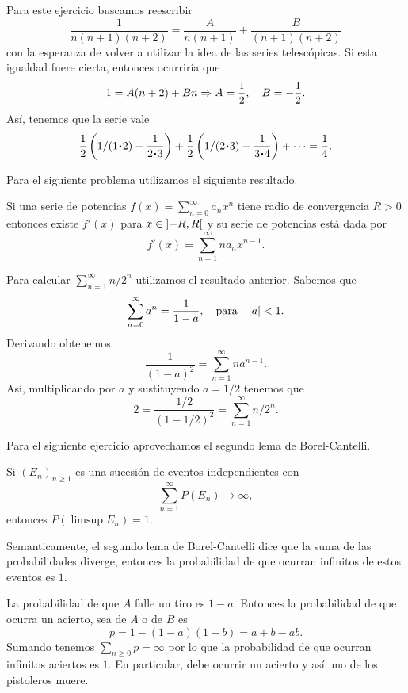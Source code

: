 \documentclass[12pt]{memoir}
\begin{document}
\begin{Ej}
    Para este ejercicio buscamos reescribir
    \[
    \frac{1}{n(n+1)(n+2)}=\frac{A}{n(n+1)}+\frac{B}{(n+1)(n+2)}
    \]
    con la esperanza de volver a utilizar la idea de las series telescópicas. Si esta igualdad fuere cierta, entonces ocurriría que 
    \[
    1=A(n+2)+Bn\To A=\half,\quad B=-\half.
    \]
    Así, tenemos que la serie vale
    \[
    \half\left(1/(1\.2)-\frac{1}{2\.3}\right)+\half\left(1/(2\.3)-\frac{1}{3\.4}\right)+\dots=\frac{1}{4}.
    \]
\end{Ej}

Para el siguiente problema utilizamos el siguiente resultado.

\begin{Th}
Si una serie de potencias \(f(x)=\sum_{n=0}^{\infty}a_nx^n\) tiene radio de convergencia \(R>0\) entonces existe \(f'(x)\) para \(x\in\left\rbrack-R,R\right\lbrack\) y su serie de potencias está dada por 
\[
f'(x)=\sum_{n=1}^{\infty}na_nx^{n-1}.
\]
\end{Th}

\begin{Ej}
    Para calcular \(\sum_{n=1}^{\infty}n/2^n\) utilizamos el resultado anterior. Sabemos que 
    \[
    \sum_{n=0}^{\infty}a^n=\frac{1}{1-a},\quad\text{para}\quad|a|<1.
    \]
    Derivando obtenemos 
    \[
    \frac{1}{(1-a)^2}=\sum_{n=1}^{\infty}na^{n-1}.
    \]
    Así, multiplicando por \(a\) y sustituyendo \(a=1/2\) tenemos que 
    \[
    2=\frac{1/2}{(1-1/2)^2}=\sum_{n=1}^{\infty}n/2^n.
    \]
\end{Ej}

Para el siguiente ejercicio aprovechamos el segundo lema de Borel-Cantelli. 

\begin{Th}
    Si \((E_n)_{n\geq 1}\) es una sucesión de eventos independientes con 
    \[
    \sum_{n=1}^\infty P(E_n)\to\infty,
    \]
    entonces \(P(\limsup E_n) = 1\). 
\end{Th}

Semanticamente, el segundo lema de Borel-Cantelli dice que la suma de las probabilidades diverge, entonces la probabilidad de que ocurran infinitos de estos eventos es \(1\).

\begin{Ej}
    La probabilidad de que \(A\) falle un tiro es \(1-a\). Entonces la probabilidad de que ocurra un acierto, sea de \(A\) o de \(B\) es 
    \[
    p=1-(1-a)(1-b)=a+b-ab.
    \]
    Sumando tenemos \(\sum_{n\geq 0} p=\infty\) por lo que la probabilidad de que ocurran infinitos aciertos es \(1\). En particular, debe ocurrir un acierto y así uno de los pistoleros muere.
\end{Ej}
\end{document}
